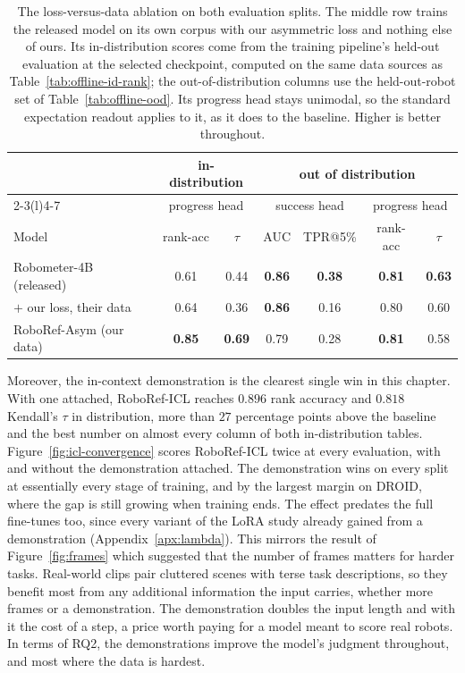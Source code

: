 \begin{table}[h]
\centering\footnotesize
\caption[Loss-versus-data ablation]{The loss-versus-data ablation on both evaluation splits. The middle row trains the released model on its own corpus with our asymmetric loss and nothing else of ours. Its in-distribution scores come from the training pipeline's held-out evaluation at the selected checkpoint, computed on the same data sources as Table~\ref{tab:offline-id-rank}; the out-of-distribution columns use the held-out-robot set of Table~\ref{tab:offline-ood}. Its progress head stays unimodal, so the standard expectation readout applies to it, as it does to the baseline. Higher is better throughout.}
\label{tab:offline-abl}
\setlength{\tabcolsep}{2.5pt}
\begin{tabular}{@{}lcc@{\hskip 8pt}cccc@{}}
\toprule
 & \multicolumn{2}{c}{in-distribution} & \multicolumn{4}{c}{out of distribution} \\
\cmidrule(lr){2-3}\cmidrule(l){4-7}
 & \multicolumn{2}{c}{progress head} & \multicolumn{2}{c}{success head} & \multicolumn{2}{c}{progress head} \\
Model & rank-acc & $\tau$ & AUC & TPR@5\% & rank-acc & $\tau$ \\
\midrule
Robometer-4B (released) & 0.61 & 0.44 & \textbf{0.86} & \textbf{0.38} & \textbf{0.81} & \textbf{0.63} \\
$+$ our loss, their data & 0.64 & 0.36 & \textbf{0.86} & 0.16 & 0.80 & 0.60 \\
RoboRef-Asym (our data) & \textbf{0.85} & \textbf{0.69} & 0.79 & 0.28 & \textbf{0.81} & 0.58 \\
\bottomrule
\end{tabular}
\end{table}

Moreover, the in-context demonstration is the clearest single win in this chapter. With one attached, RoboRef-ICL reaches $0.896$ rank accuracy and $0.818$ Kendall's $\tau$ in distribution, more than $27$ percentage points above the baseline and the best number on almost every column of both in-distribution tables. Figure~\ref{fig:icl-convergence} scores RoboRef-ICL twice at every evaluation, with and without the demonstration attached. The demonstration wins on every split at essentially every stage of training, and by the largest margin on DROID, where the gap is still growing when training ends. The effect predates the full fine-tunes too, since every variant of the LoRA study already gained from a demonstration (Appendix~\ref{apx:lambda}). This mirrors the result of Figure~\ref{fig:frames} which suggested that the number of frames matters for harder tasks. Real-world clips pair cluttered scenes with terse task descriptions, so they benefit most from any additional information the input carries, whether more frames or a demonstration. The demonstration doubles the input length and with it the cost of a step, a price worth paying for a model meant to score real robots. In terms of RQ2, the demonstrations improve the model's judgment throughout, and most where the data is hardest.

